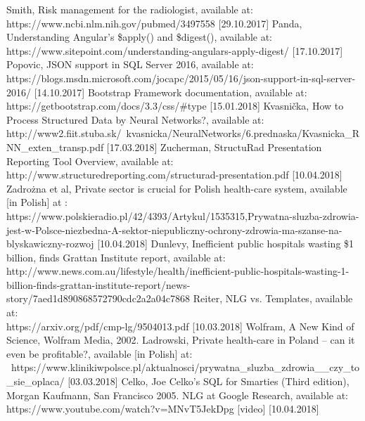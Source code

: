 \documentclass[12pt, twoside, openany]{report}
\theoremstyle{definition}
\begin{document}
\begin{thebibliography}{11}
 Smith, Risk management for the radiologist, available at:\\ https://www.ncbi.nlm.nih.gov/pubmed/3497558 [29.10.2017]
 Panda, Understanding Angular’s \$apply() and \$digest(), available at:\\ https://www.sitepoint.com/understanding-angulars-apply-digest/ [17.10.2017]
 Popovic, JSON support in SQL Server 2016, available at: \\
https://blogs.msdn.microsoft.com/jocapc/2015/05/16/json-support-in-sql-server-2016/ [14.10.2017]
 Bootstrap Framework documentation, available at: https://getbootstrap.com/docs/3.3/css/\#type [15.01.2018]
 Kvasnička, 
How to Process Structured 
Data by Neural Networks?, available at: \\http://www2.fiit.stuba.sk/~kvasnicka/NeuralNetworks/6.prednaska/Kvasnicka\_RNN\_exten\_transp.pdf [17.03.2018]
Zucherman, StructuRad Presentation
Reporting Tool Overview, available at: \\http://www.structuredreporting.com/structurad-presentation.pdf [10.04.2018]
 Zadrożna et al, Private sector is crucial for Polish health-care system, available [in Polish] at :\\ https://www.polskieradio.pl/42/4393/Artykul/1535315,Prywatna-sluzba-zdrowia-jest-w-Polsce-niezbedna-A-sektor-niepubliczny-ochrony-zdrowia-ma-szanse-na-blyskawiczny-rozwoj [10.04.2018]
 Dunlevy, Inefficient public hospitals wasting \$1 billion, finds Grattan Institute report, available at: \\ http://www.news.com.au/lifestyle/health/inefficient-public-hospitals-wasting-1-billion-finds-grattan-institute-report/news-story/7aed1d890868572790cdc2a2a04c7868
 Reiter, NLG vs. Templates, available at: \\
https://arxiv.org/pdf/cmp-lg/9504013.pdf [10.03.2018]
Wolfram, A New Kind of Science, Wolfram Media, 2002.
Ladrowski, Private health-care in Poland -- can it even be profitable?, available [in Polish] at: \\\ https://www.klinikiwpolsce.pl/aktualnosci/prywatna\_sluzba\_zdrowia\_\_czy\_to\_sie\_oplaca/ [03.03.2018]
Celko, Joe Celko's SQL for Smarties (Third edition), Morgan Kaufmann, San Francisco 2005.
 NLG at Google Research, available at:
 https://www.youtube.com/watch?v=MNvT5JekDpg [video] [10.04.2018]
\end{thebibliography}
\end{document}
